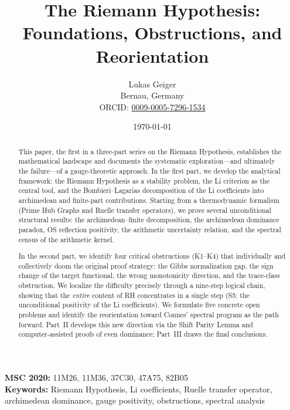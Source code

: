 \documentclass[12pt,a4paper]{article}
\title{The Riemann Hypothesis:\\
Foundations, Obstructions, and Reorientation}
\author{Lukas Geiger\\
\small Bernau, Germany\\
\small ORCID: \href{https://orcid.org/0009-0005-7296-1534}{0009-0005-7296-1534}}
\date{\today}
\theoremstyle{definition}
\theoremstyle{remark}
\begin{document}
\overfullrule=0pt
\maketitle

\begin{abstract}
This paper, the first in a three-part series on the Riemann Hypothesis, establishes the mathematical landscape and documents the systematic exploration---and ultimately the failure---of a gauge-theoretic approach. In the first part, we develop the analytical framework: the Riemann Hypothesis as a stability problem, the Li criterion as the central tool, and the Bombieri--Lagarias decomposition of the Li coefficients into archimedean and finite-part contributions. Starting from a thermodynamic formalism (Prime Hub Graphs and Ruelle transfer operators), we prove several unconditional structural results: the archimedean--finite decomposition, the archimedean dominance paradox, OS reflection positivity, the arithmetic uncertainty relation, and the spectral census of the arithmetic kernel.

In the second part, we identify four critical obstructions (K1--K4) that individually and collectively doom the original proof strategy: the Gibbs normalization gap, the sign change of the target functional, the wrong monotonicity direction, and the trace-class obstruction. We localize the difficulty precisely through a nine-step logical chain, showing that the \emph{entire} content of RH concentrates in a single step (S5: the unconditional positivity of the Li coefficients). We formulate five concrete open problems and identify the reorientation toward Connes' spectral program as the path forward. Part~II develops this new direction via the Shift Parity Lemma and computer-assisted proofs of even dominance; Part~III draws the final conclusions.
\end{abstract}

\noindent\textbf{MSC 2020:} 11M26, 11M36, 37C30, 47A75, 82B05\\
\textbf{Keywords:} Riemann Hypothesis, Li coefficients, Ruelle transfer operator, archimedean dominance, gauge positivity, obstructions, spectral analysis

\newpage
\tableofcontents
\newpage


\end{document}
